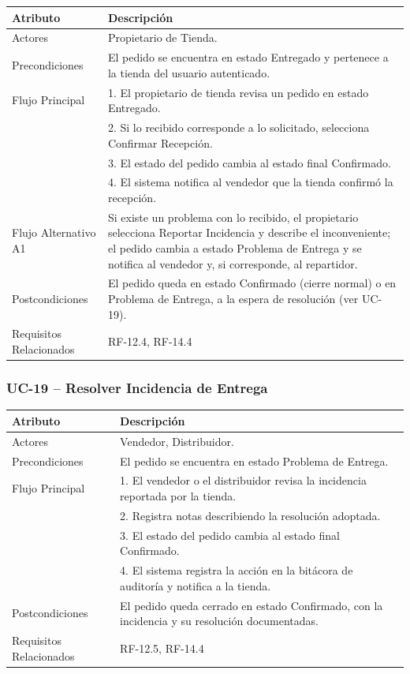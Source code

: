 \documentclass[12pt,a4paper]{report}
\begin{document}
\begin{longtable}{|p{4cm}|p{10cm}|}
\hline
\textbf{Atributo} & \textbf{Descripción} \\ \hline
Actores & Propietario de Tienda. \\ \hline
Precondiciones & El pedido se encuentra en estado Entregado y pertenece a la tienda del usuario autenticado. \\ \hline
Flujo Principal &
1. El propietario de tienda revisa un pedido en estado Entregado.\\
& 2. Si lo recibido corresponde a lo solicitado, selecciona Confirmar Recepción.\\
& 3. El estado del pedido cambia al estado final Confirmado.\\
& 4. El sistema notifica al vendedor que la tienda confirmó la recepción. \\ \hline
Flujo Alternativo A1 & Si existe un problema con lo recibido, el propietario selecciona Reportar Incidencia y describe el inconveniente; el pedido cambia a estado Problema de Entrega y se notifica al vendedor y, si corresponde, al repartidor. \\ \hline
Postcondiciones & El pedido queda en estado Confirmado (cierre normal) o en Problema de Entrega, a la espera de resolución (ver UC-19). \\ \hline
Requisitos Relacionados & RF-12.4, RF-14.4 \\ \hline
\end{longtable}

\subsubsection{UC-19 -- Resolver Incidencia de Entrega}

\begin{longtable}{|p{4cm}|p{10cm}|}
\hline
\textbf{Atributo} & \textbf{Descripción} \\ \hline
Actores & Vendedor, Distribuidor. \\ \hline
Precondiciones & El pedido se encuentra en estado Problema de Entrega. \\ \hline
Flujo Principal &
1. El vendedor o el distribuidor revisa la incidencia reportada por la tienda.\\
& 2. Registra notas describiendo la resolución adoptada.\\
& 3. El estado del pedido cambia al estado final Confirmado.\\
& 4. El sistema registra la acción en la bitácora de auditoría y notifica a la tienda. \\ \hline
Postcondiciones & El pedido queda cerrado en estado Confirmado, con la incidencia y su resolución documentadas. \\ \hline
Requisitos Relacionados & RF-12.5, RF-14.4 \\ \hline
\end{longtable}
\end{document}
